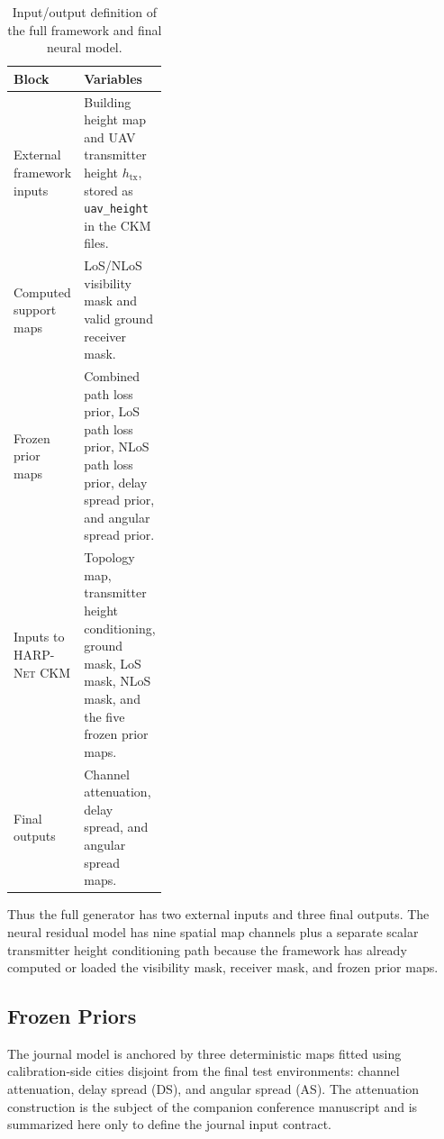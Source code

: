 \documentclass[journal]{IEEEtran}
\begin{document}
\begin{table}[!t]
\centering
\caption{Input/output definition of the full framework and final neural model.}
\label{tab:io-definition-paper}
\scriptsize
\setlength{\tabcolsep}{3pt}
\begin{tabularx}{\linewidth}{p{0.34\linewidth}X}
\toprule
Block & Variables \\
\midrule
External framework inputs &
Building height map and UAV transmitter height \(h_{\mathrm{tx}}\), stored as \texttt{uav\_height} in the CKM files. \\
Computed support maps &
LoS/NLoS visibility mask and valid ground receiver mask. \\
Frozen prior maps &
Combined path loss prior, LoS path loss prior, NLoS path loss prior,
delay spread prior, and angular spread prior. \\
Inputs to \textsc{HARP-Net CKM} &
Topology map, transmitter height conditioning, ground mask, LoS mask, NLoS mask,
and the five frozen prior maps. \\
Final outputs &
Channel attenuation, delay spread, and angular spread maps. \\
\bottomrule
\end{tabularx}
\end{table}

Thus the full generator has two external inputs and three final outputs. The
neural residual model has nine spatial map channels plus a separate scalar
transmitter height conditioning path because the framework has already computed
or loaded the visibility mask, receiver mask, and frozen prior maps.

\subsection{Frozen Priors}

The journal model is anchored by three deterministic maps fitted using
calibration-side cities disjoint from the final test environments: channel
attenuation, delay spread (DS), and angular spread (AS).
The attenuation construction is the subject of the companion conference
manuscript and is summarized here only to define the journal input contract.
\end{document}
